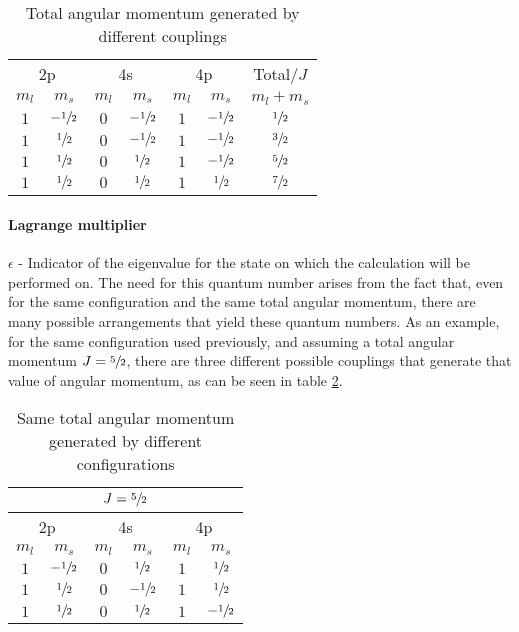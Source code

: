 \begin{table}[h!]
    \centering
    \caption{Total angular momentum generated by different couplings}
    \label{tab:tot_ang_mom}
    \begin{tabular}{cc| cc | cc|c}
        \toprule \multicolumn{2}{c|}{2p}&\multicolumn{2}{c|}{4s}&\multicolumn{2}{c|}{4p}&Total/$J$\\
        $m_l$ & $m_s$ & $m_l$&$m_s$&$m_l$&$m_s$&$m_l+m_s$\\\midrule
        $1$&$-\sfrac{1}{2}$&$0$&$-\sfrac{1}{2}$&$1$&$-\sfrac{1}{2}$&$\sfrac{1}{2}$\\
        $1$&$\sfrac{1}{2}$&$0$&$-\sfrac{1}{2}$&$1$&$-\sfrac{1}{2}$&$\sfrac{3}{2}$\\
        $1$&$\sfrac{1}{2}$&$0$&$\sfrac{1}{2}$&$1$&$-\sfrac{1}{2}$&$\sfrac{5}{2}$\\
        $1$&$\sfrac{1}{2}$&$0$&$\sfrac{1}{2}$&$1$&$\sfrac{1}{2}$&$\sfrac{7}{2}$\\
    \end{tabular}
\end{table}

\paragraph{Lagrange multiplier} $\epsilon$ - Indicator of the eigenvalue for the state on which the calculation will be performed on. The need for this quantum number arises from the fact that, even for the same configuration and the same total angular momentum, there are many possible arrangements that yield these quantum numbers. As an example, for the same configuration used previously, and assuming a total angular momentum $J=\sfrac{5}{2}$, there are three different possible couplings that generate that value of angular momentum, as can be seen in table \ref{tab:epsilon}.


\begin{table}[h!]
    \centering
    \caption{Same total angular momentum generated by different configurations}\label{tab:epsilon}
    \begin{tabular}{cc| cc | cc}
        \toprule\multicolumn{6}{c}{$J=\sfrac{5}{2}$}\\\midrule
        \multicolumn{2}{c|}{2p}&\multicolumn{2}{c|}{4s}&\multicolumn{2}{c}{4p}\\
        $m_l$ & $m_s$ & $m_l$&$m_s$&$m_l$&$m_s$\\\midrule
        $1$&$-\sfrac{1}{2}$&$0$&$\sfrac{1}{2}$&$1$&$\sfrac{1}{2}$\\
        $1$&$\sfrac{1}{2}$&$0$&$-\sfrac{1}{2}$&$1$&$\sfrac{1}{2}$\\
        $1$&$\sfrac{1}{2}$&$0$&$\sfrac{1}{2}$&$1$&$-\sfrac{1}{2}$\\\bottomrule
    \end{tabular}
\end{table}

